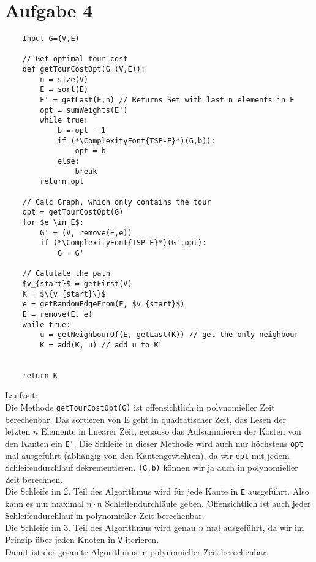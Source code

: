\documentclass[a4paper,11pt]{scrartcl}
\begin{document}
	\section*{Aufgabe 4}
	\begin{lstlisting}
	Input G=(V,E)	
	
	// Get optimal tour cost
	def getTourCostOpt(G=(V,E)):
		n = size(V)
		E = sort(E)
		E' = getLast(E,n) // Returns Set with last n elements in E
		opt = sumWeights(E')
		while true:
			b = opt - 1
			if (*\ComplexityFont{TSP-E}*)(G,b)):
				opt = b
			else:
				break
		return opt
	
	// Calc Graph, which only contains the tour
	opt = getTourCostOpt(G)
	for $e \in E$:
		G' = (V, remove(E,e))
		if (*\ComplexityFont{TSP-E}*)(G',opt):
			G = G'
	
	// Calulate the path
	$v_{start}$ = getFirst(V)
	K = $\{v_{start}\}$
	e = getRandomEdgeFrom(E, $v_{start}$)
	E = remove(E, e)
	while true:
		u = getNeighbourOf(E, getLast(K)) // get the only neighbour
		K = add(K, u) // add u to K
	
	
	return K
	\end{lstlisting}
	
	Laufzeit:\\
	Die Methode \verb|getTourCostOpt(G)| ist offensichtlich in polynomieller Zeit berechenbar. Das sortieren von E geht in quadratischer Zeit, das Lesen der letzten $n$ Elemente in linearer Zeit, genauso das Aufsummieren der Kosten von den Kanten ein \verb|E'|. Die Schleife in dieser Methode wird auch nur höchstens \verb|opt| mal ausgeführt (abhängig von den Kantengewichten), da wir \verb|opt| mit jedem Schleifendurchlauf dekrementieren. \verb|(G,b)| können wir ja auch in polynomieller Zeit berechnen.\\
	Die Schleife im 2. Teil des Algorithmus wird für jede Kante in \verb|E| ausgeführt. Also kann es nur maximal $n \cdot n$ Schleifendurchläufe geben. Offensichtlich ist auch jeder Schleifendurchlauf in polynomieller Zeit berechenbar.\\
	Die Schleife im 3. Teil des Algorithmus wird genau $n$ mal ausgeführt, da wir im Prinzip über jeden Knoten in \verb|V| iterieren.\\
	Damit ist der gesamte Algorithmus in polynomieller Zeit berechenbar.\\
	
\end{document}
